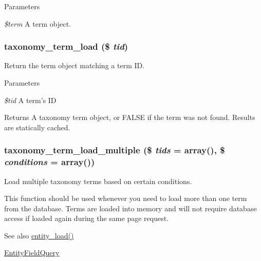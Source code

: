 \begin{DoxyParams}{Parameters}
\item[{\em \$term}]A term object. \end{DoxyParams}
\hypertarget{taxonomy_8module_a0b2a6260c6d5938f6ea5a8b0a9b2db1e}{
\subsubsection[{taxonomy\_\-term\_\-load}]{\setlength{\rightskip}{0pt plus 5cm}taxonomy\_\-term\_\-load (\$ {\em tid})}}
\label{taxonomy_8module_a0b2a6260c6d5938f6ea5a8b0a9b2db1e}
Return the term object matching a term ID.


\begin{DoxyParams}{Parameters}
\item[{\em \$tid}]A term's ID\end{DoxyParams}
\begin{DoxyReturn}{Returns}
A taxonomy term object, or FALSE if the term was not found. Results are statically cached. 
\end{DoxyReturn}
\hypertarget{taxonomy_8module_add67d5d48fc273cf997a650cfb376cda}{
\subsubsection[{taxonomy\_\-term\_\-load\_\-multiple}]{\setlength{\rightskip}{0pt plus 5cm}taxonomy\_\-term\_\-load\_\-multiple (\$ {\em tids} = {\ttfamily array()}, \/  \$ {\em conditions} = {\ttfamily array()})}}
\label{taxonomy_8module_add67d5d48fc273cf997a650cfb376cda}
Load multiple taxonomy terms based on certain conditions.

This function should be used whenever you need to load more than one term from the database. Terms are loaded into memory and will not require database access if loaded again during the same page request.

\begin{DoxySeeAlso}{See also}
\hyperlink{common_8inc_a78b89cf93f9710a68d02f86adccf1898}{entity\_\-load()} 

\hyperlink{classEntityFieldQuery}{EntityFieldQuery}
\end{DoxySeeAlso}

